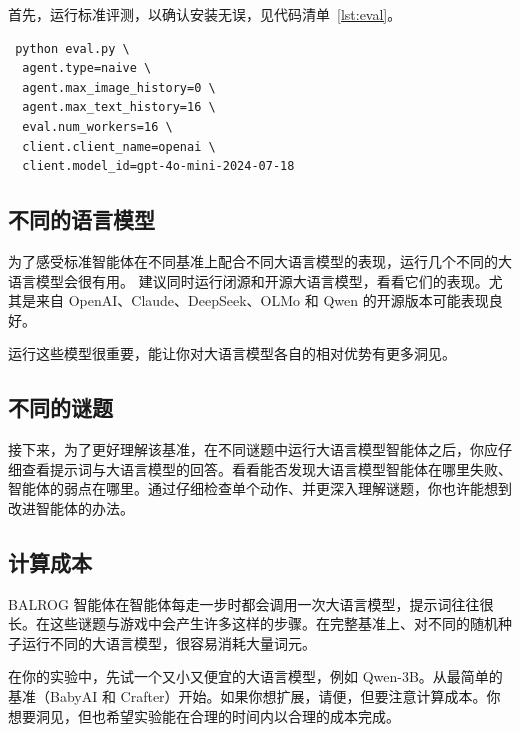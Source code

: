 首先，运行标准评测，以确认安装无误，见代码清单~\ref{lst:eval}。
\begin{listing}
    \begin{verbatim}
 python eval.py \
  agent.type=naive \
  agent.max_image_history=0 \
  agent.max_text_history=16 \
  eval.num_workers=16 \
  client.client_name=openai \
  client.model_id=gpt-4o-mini-2024-07-18       
    \end{verbatim}
    \caption{运行标准评测}\label{lst:eval}
\end{listing}




\subsection{不同的语言模型}

为了感受标准智能体在不同基准上配合不同大语言模型的表现，运行几个不同的大语言模型会很有用。%
建议同时运行闭源和开源大语言模型，看看它们的表现。尤其是来自 OpenAI、Claude、DeepSeek、OLMo 和 Qwen 的开源版本可能表现良好。

运行这些模型很重要，能让你对大语言模型各自的相对优势有更多洞见。

\subsection{不同的谜题}
接下来，为了更好理解该基准，在不同谜题中运行大语言模型智能体之后，你应仔细查看提示词与大语言模型的回答。看看能否发现大语言模型智能体在哪里失败、智能体的弱点在哪里。通过仔细检查单个动作、并更深入理解谜题，你也许能想到改进智能体的办法。

\subsection{计算成本}
BALROG 智能体在智能体每走一步时都会调用一次大语言模型，提示词往往很长。在这些谜题与游戏中会产生许多这样的步骤。在完整基准上、对不同的随机种子运行不同的大语言模型，很容易消耗大量词元。

在你的实验中，先试一个又小又便宜的大语言模型，例如 Qwen-3B。从最简单的基准（BabyAI 和 Crafter）开始。如果你想扩展，请便，但要注意计算成本。你想要洞见，但也希望实验能在合理的时间内以合理的成本完成。

